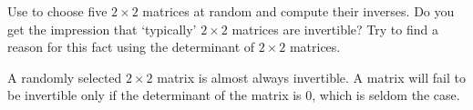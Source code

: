 \documentclass{ximera}
\begin{document}
\begin{computerExercise} \label{c4.9.9}
Use \Matlab to choose five $2\times 2$ matrices at random and compute
their inverses.  Do you get the impression that `typically'
$2\times 2$ matrices are invertible?  Try to find a reason for
this fact using the determinant of $2\times 2$ matrices.

\begin{solution}

A randomly selected $2 \times 2$ matrix is almost always invertible.
A matrix will fail to be invertible only if the determinant of the
matrix is $0$, which is seldom the case.

\end{solution}
\end{computerExercise}
\end{document}
